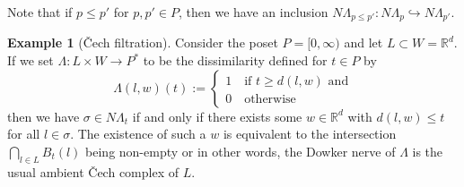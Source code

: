 \documentclass[10pt,a4paper]{article}
\theoremstyle{definition}
\newtheorem{ex}{Example}[thm]
\newcommand{\R}{\mathbb{R}}
\begin{document}
Note that if $p\leq p'$ for $p,p'\in P$, then we have an inclusion $N\Lambda_{p\leq p'}\colon N\Lambda_p\hookrightarrow N\Lambda_{p'}$.

\begin{ex}[Čech filtration]

Consider the poset $P=[0,\infty)$ and let $L\subset W=\R^d$. If we set $\Lambda\colon L\times W\to P^*$ to be the dissimilarity defined for $t\in P$ by 
$$
\Lambda(l,w)(t) := \begin{cases}
	1\quad\text{if }t\geq d(l,w) \text{ and}\\
	0\quad\text{otherwise}
\end{cases}
$$
then we have $\sigma\in N\Lambda_t$ if and only if there exists some $w\in\R^d$ with $d(l,w)\leq t$ for all $l\in\sigma$. The existence of such a $w$ is equivalent to the intersection $\bigcap_{l\in L}B_t(l)$ being non-empty or in other words, the Dowker nerve of $\Lambda$ is the usual ambient Čech complex of $L$.
\end{ex}
\end{document}
